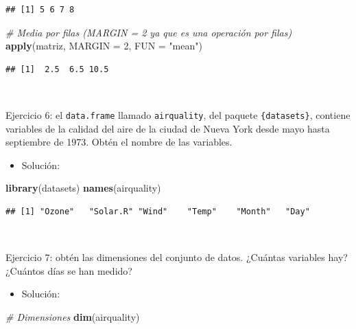 \documentclass[11pt,]{book}
\newenvironment{Shaded}{\begin{snugshade}}{\end{snugshade}}
\newcommand{\CommentTok}[1]{\textcolor[rgb]{0.37,0.37,0.37}{\textit{#1}}}
\newcommand{\DataTypeTok}[1]{\textcolor[rgb]{0.27,0.27,0.27}{#1}}
\newcommand{\DecValTok}[1]{\textcolor[rgb]{0.06,0.06,0.06}{#1}}
\newcommand{\KeywordTok}[1]{\textcolor[rgb]{0.27,0.27,0.27}{\textbf{#1}}}
\newcommand{\NormalTok}[1]{#1}
\newcommand{\StringTok}[1]{\textcolor[rgb]{0.5,0.5,0.5}{#1}}
\providecommand{\tightlist}{%
  \setlength{\itemsep}{0pt}\setlength{\parskip}{0pt}}
\begin{document}
\begin{verbatim}
## [1] 5 6 7 8
\end{verbatim}

\begin{Shaded}
\begin{Highlighting}[]
\CommentTok{# Media por filas (MARGIN = 2 ya que es una operación por filas)}
\KeywordTok{apply}\NormalTok{(matriz, }\DataTypeTok{MARGIN =} \DecValTok{2}\NormalTok{, }\DataTypeTok{FUN =} \StringTok{"mean"}\NormalTok{)}
\end{Highlighting}
\end{Shaded}

\begin{verbatim}
## [1]  2.5  6.5 10.5
\end{verbatim}

~

Ejercicio 6: el \texttt{data.frame} llamado \texttt{airquality}, del paquete \texttt{\{datasets\}}, contiene variables de la calidad del aire de la ciudad de Nueva York desde mayo hasta septiembre de 1973. Obtén el nombre de las variables.

\begin{itemize}
\tightlist
\item
  Solución:
\end{itemize}

\begin{Shaded}
\begin{Highlighting}[]
\KeywordTok{library}\NormalTok{(datasets)}
\KeywordTok{names}\NormalTok{(airquality)}
\end{Highlighting}
\end{Shaded}

\begin{verbatim}
## [1] "Ozone"   "Solar.R" "Wind"    "Temp"    "Month"   "Day"
\end{verbatim}

~

Ejercicio 7: obtén las dimensiones del conjunto de datos. ¿Cuántas variables hay? ¿Cuántos días se han medido?

\begin{itemize}
\tightlist
\item
  Solución:
\end{itemize}

\begin{Shaded}
\begin{Highlighting}[]
\CommentTok{# Dimensiones}
\KeywordTok{dim}\NormalTok{(airquality)}
\end{Highlighting}
\end{Shaded}
\end{document}
